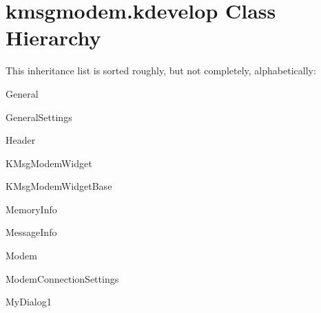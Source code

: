 \section{kmsgmodem.kdevelop Class Hierarchy}
This inheritance list is sorted roughly, but not completely, alphabetically:\begin{CompactList}
\item {}
\item {}
\item General\item General\-Settings\item Header\item {}
\item KMsg\-Modem\-Widget\item KMsg\-Modem\-Widget\-Base\item Memory\-Info\item Message\-Info\item Modem\item Modem\-Connection\-Settings\item My\-Dialog1\item {}
\item {}
\begin{CompactList}
\item {}
\end{CompactList}
\item {}
\end{CompactList}
